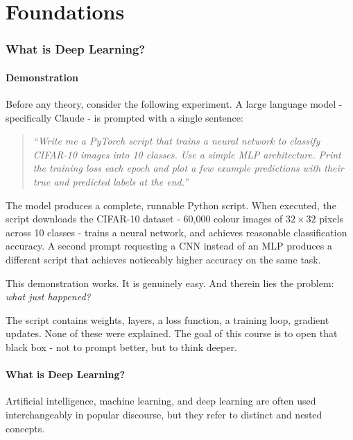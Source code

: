 \part{Foundations}

\section{What is Deep Learning?}

\subsection{Demonstration}

Before any theory, consider the following experiment. A large language model - specifically Claude - is prompted with a single sentence:

\begin{quote}
\textit{``Write me a PyTorch script that trains a neural network to classify CIFAR-10 images into 10 classes. Use a simple MLP architecture. Print the training loss each epoch and plot a few example predictions with their true and predicted labels at the end.''}
\end{quote}

The model produces a complete, runnable Python script. When executed, the script downloads the CIFAR-10 dataset - 60,000 colour images of $32 \times 32$ pixels across 10 classes - trains a neural network, and achieves reasonable classification accuracy. A second prompt requesting a CNN instead of an MLP produces a different script that achieves noticeably higher accuracy on the same task.

This demonstration works. It is genuinely easy. And therein lies the problem: \textit{what just happened?}

The script contains weights, layers, a loss function, a training loop, gradient updates. None of these were explained. The goal of this course is to open that black box - not to prompt better, but to think deeper.

\subsection{What is Deep Learning?}

Artificial intelligence, machine learning, and deep learning are often used interchangeably in popular discourse, but they refer to distinct and nested concepts.

